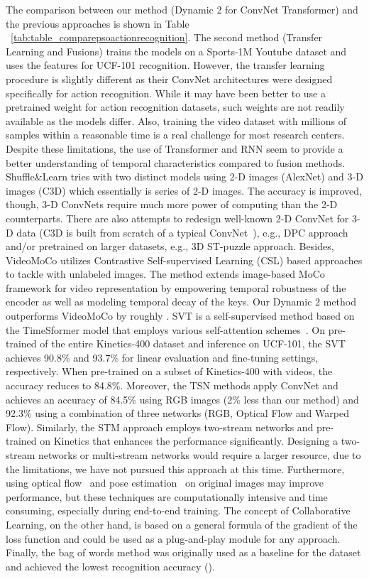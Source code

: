 \documentclass[fleqn,10pt]{wlscirep}
\begin{document}
The comparison between our method (Dynamic 2 for ConvNet Transformer) and the previous approaches is shown in Table ~\ref{tab:table_comparepsoactionrecognition}. The second method (Transfer Learning and Fusions) trains the models on a Sports-1M Youtube dataset and uses the features for UCF-101 recognition. However, the transfer learning procedure is slightly different as their ConvNet architectures were designed specifically for action recognition. While it may have been better to use a pretrained weight for action recognition datasets, such weights are not readily available as the models differ. Also, training the video dataset with millions of samples within a reasonable time is a real challenge for most research centers. Despite these limitations, the use of Transformer and RNN seem to provide a better understanding of temporal characteristics compared to fusion methods. Shuffle\&Learn tries with two distinct models using 2-D images (AlexNet) and 3-D images (C3D) which essentially is series of 2-D images. The accuracy is improved, though, 3-D ConvNets require much more power of computing than the 2-D counterparts. There are also attempts to redesign well-known 2-D ConvNet for 3-D data (C3D is built from scratch of a typical ConvNet~\cite{tran2015learning}), e.g., DPC approach and/or pretrained on larger datasets, e.g., 3D ST-puzzle approach. Besides, VideoMoCo utilizes Contrastive Self-supervised Learning (CSL) based approaches to tackle with unlabeled images. The method extends image-based MoCo framework for video representation by empowering temporal robustness of the encoder as well as modeling temporal decay of the keys. Our Dynamic 2 method outperforms VideoMoCo by roughly . SVT is a self-supervised method based on the TimeSformer model that employs various self-attention schemes~\cite{bertasius2021space}. On pre-trained of the entire Kinetics-400 dataset and inference on UCF-101, the SVT achieves 90.8\% and 93.7\% for linear evaluation and fine-tuning settings, respectively. When pre-trained on a subset of Kinetics-400 with  videos, the accuracy reduces to 84.8\%. Moreover, the TSN methods apply ConvNet and achieves an accuracy of 84.5\% using RGB images (2\% less than our method) and 92.3\% using a combination of three networks (RGB, Optical Flow and Warped Flow). Similarly, the STM approach employs two-stream networks and pre-trained on Kinetics that enhances the performance significantly. Designing a two-stream networks or multi-stream networks would require a larger resource, due to the limitations, we have not pursued this approach at this time. Furthermore, using optical flow~\cite{zhao2022global} and pose estimation~\cite{fang2023alphapose} on original images may improve performance, but these techniques are computationally intensive and time consuming, especially during end-to-end training. The concept of Collaborative Learning, on the other hand, is based on a general formula of the gradient of the loss function and could be used as a plug-and-play module for any approach. Finally, the bag of words method was originally used as a baseline for the dataset and achieved the lowest recognition accuracy ().
\end{document}
